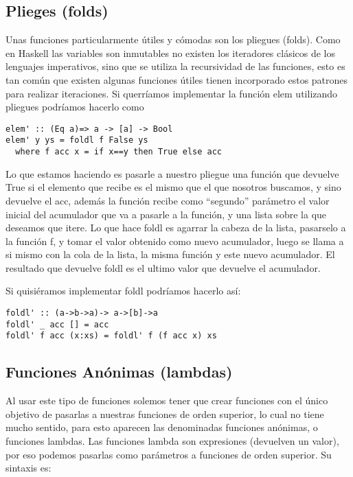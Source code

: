 \subsection{Plieges (folds)} %
\label{sub:plieges_}

Unas funciones particularmente útiles y cómodas son los pliegues (folds).
Como en Haskell las variables son inmutables no existen los iteradores clásicos de los lenguajes imperativos, sino que se utiliza la recursividad de las funciones, esto es tan común que existen algunas funciones útiles tienen incorporado estos patrones para realizar iteraciones. Si querríamos implementar la función elem utilizando pliegues podríamos hacerlo como

\begin{lstlisting}
elem' :: (Eq a)=> a -> [a] -> Bool
elem' y ys = foldl f False ys
  where f acc x = if x==y then True else acc
\end{lstlisting}

Lo que estamos haciendo es pasarle a nuestro pliegue una función que devuelve True si el elemento que recibe es el mismo que el que nosotros buscamos, y sino devuelve el acc, además la función recibe como “segundo” parámetro el valor inicial del acumulador que va a pasarle a la función, y una lista sobre la que deseamos que itere. Lo que hace foldl es agarrar la cabeza de la lista, pasarselo a la función f, y tomar el valor obtenido como nuevo acumulador, luego se llama a si mismo con la cola de la lista, la misma función y este nuevo acumulador. El resultado que devuelve foldl es el ultimo valor que devuelve el acumulador.

Si quisiéramos implementar foldl podríamos hacerlo así:

\begin{lstlisting}
foldl' :: (a->b->a)-> a->[b]->a
foldl' _ acc [] = acc
foldl' f acc (x:xs) = foldl' f (f acc x) xs
\end{lstlisting}



\subsection{Funciones Anónimas (lambdas)} %
\label{sub:funciones_an_nimas_}


Al usar este tipo de funciones solemos tener que crear funciones con el único objetivo de pasarlas a nuestras funciones de orden superior, lo cual no tiene mucho sentido, para esto aparecen las denominadas funciones anónimas, o funciones lambdas. Las funciones lambda son expresiones (devuelven un valor), por eso podemos pasarlas como parámetros a funciones de orden superior.
Su sintaxis es:

